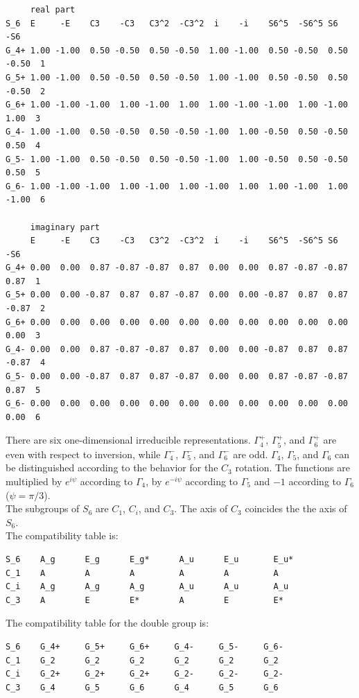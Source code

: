 \documentclass[12pt,a4paper]{article}
\begin{document}
\begin{verbatim}
     real part
S_6  E     -E    C3    -C3   C3^2  -C3^2  i    -i    S6^5  -S6^5 S6    -S6  
G_4+ 1.00 -1.00  0.50 -0.50  0.50 -0.50  1.00 -1.00  0.50 -0.50  0.50 -0.50  1
G_5+ 1.00 -1.00  0.50 -0.50  0.50 -0.50  1.00 -1.00  0.50 -0.50  0.50 -0.50  2
G_6+ 1.00 -1.00 -1.00  1.00 -1.00  1.00  1.00 -1.00 -1.00  1.00 -1.00  1.00  3
G_4- 1.00 -1.00  0.50 -0.50  0.50 -0.50 -1.00  1.00 -0.50  0.50 -0.50  0.50  4
G_5- 1.00 -1.00  0.50 -0.50  0.50 -0.50 -1.00  1.00 -0.50  0.50 -0.50  0.50  5
G_6- 1.00 -1.00 -1.00  1.00 -1.00  1.00 -1.00  1.00  1.00 -1.00  1.00 -1.00  6

     imaginary part
     E     -E    C3    -C3   C3^2  -C3^2  i    -i    S6^5  -S6^5 S6    -S6  
G_4+ 0.00  0.00  0.87 -0.87 -0.87  0.87  0.00  0.00  0.87 -0.87 -0.87  0.87  1 
G_5+ 0.00  0.00 -0.87  0.87  0.87 -0.87  0.00  0.00 -0.87  0.87  0.87 -0.87  2
G_6+ 0.00  0.00  0.00  0.00  0.00  0.00  0.00  0.00  0.00  0.00  0.00  0.00  3
G_4- 0.00  0.00  0.87 -0.87 -0.87  0.87  0.00  0.00 -0.87  0.87  0.87 -0.87  4
G_5- 0.00  0.00 -0.87  0.87  0.87 -0.87  0.00  0.00  0.87 -0.87 -0.87  0.87  5
G_6- 0.00  0.00  0.00  0.00  0.00  0.00  0.00  0.00  0.00  0.00  0.00  0.00  6
\end{verbatim}
There are six one-dimensional irreducible representations. $\Gamma_4^+$,
$\Gamma_5^+$, and $\Gamma_6^+$ are even with respect to inversion, while
$\Gamma_4^-$, $\Gamma_5^-$, and $\Gamma_6^-$ are odd. $\Gamma_4$, $\Gamma_5$,
and $\Gamma_6$ can be distinguished according to the behavior for the
$C_3$ rotation. The functions are multiplied by $e^{i\psi}$ according to
$\Gamma_4$, by $e^{-i\psi}$ according to $\Gamma_5$ and $-1$ according
to $\Gamma_6$ ($\psi=\pi/3$). \\
The subgroups of $S_6$ are $C_1$, $C_i$, and $C_3$. The axis of $C_3$ coincides
the the axis of $S_6$. \\
The compatibility table is:
\begin{verbatim}
S_6    A_g      E_g      E_g*      A_u      E_u       E_u*  
C_1    A        A        A         A        A         A
C_i    A_g      A_g      A_g       A_u      A_u       A_u
C_3    A        E        E*        A        E         E*
\end{verbatim}
The compatibility table for the double group is:
\begin{verbatim}
S_6    G_4+     G_5+     G_6+     G_4-     G_5-     G_6-  
C_1    G_2      G_2      G_2      G_2      G_2      G_2
C_i    G_2+     G_2+     G_2+     G_2-     G_2-     G_2-
C_3    G_4      G_5      G_6      G_4      G_5      G_6 
\end{verbatim}
\end{document}
